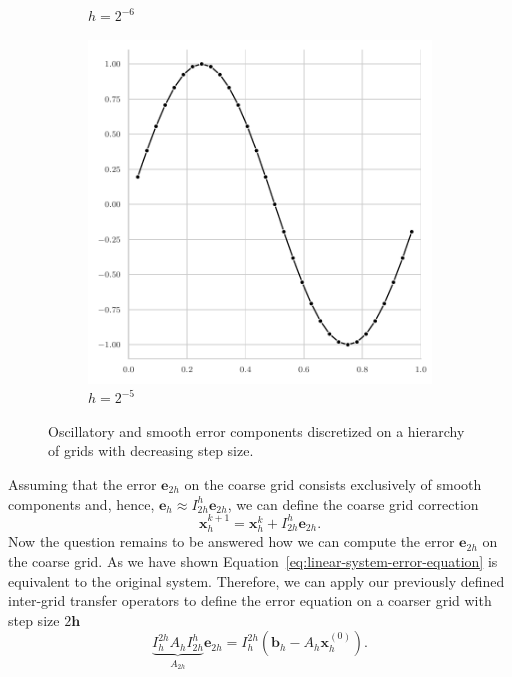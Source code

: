 \begin{figure}
\begin{subfigure}[b]{0.32\textwidth}
		\caption{$h = 2^{-6}$}
	\end{subfigure}
	\hfill
	\begin{subfigure}[b]{0.32\textwidth}
		\centering
		\includegraphics[width=\textwidth]{figures/error_plots//initial_error_2pi_level5.pdf}
		\caption{$h = 2^{-5}$}
	\end{subfigure}
	\caption{Oscillatory and smooth error components discretized on a hierarchy of grids with decreasing step size.}
	\label{fig:error-on-multiple-levels}
\end{figure}
Assuming that the error $\bm{e}_{2h}$ on the coarse grid consists exclusively of smooth components and, hence, $\bm{e}_{h} \approx I_{2h}^{h} \bm{e}_{2h}$, we can define the coarse grid correction 
\begin{equation}
	\bm{x}^{k+1}_h = \bm{x}^{k}_h + I_{2h}^h \bm{e}_{2h}.
\end{equation} 
Now the question remains to be answered how we can compute the error $\bm{e}_{2h}$ on the coarse grid.
As we have shown Equation~\eqref{eq:linear-system-error-equation} is equivalent to the original system.
Therefore, we can apply our previously defined inter-grid transfer operators to define the error equation on a coarser grid with step size $2\bm{h}$
\begin{equation}
	\underbrace{I_{h}^{2h} A_h I_{2h}^h}_{A_{2h}} \bm{e}_{2h} = I_{h}^{2h} \left(\bm{b}_h - A_h \bm{x}^{(0)}_h\right).
	\label{eq:coarse-grid-error-equation}
\end{equation}

